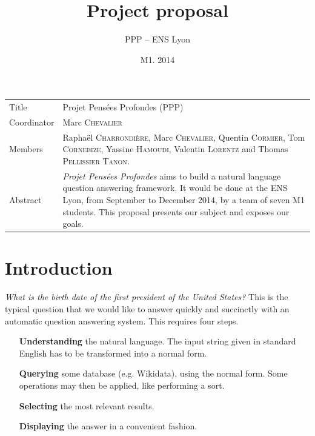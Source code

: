\documentclass[a4paper,10pt]{article}
\title{Project proposal}
\author{PPP \--- ENS Lyon}
\date{M1. 2014}
\begin{document}
\maketitle

\newlength{\title}
\settowidth{\title}{Coordinator }

\newlength{\object}
\setlength{\object}{\textwidth} \addtolength{\object}{-\title} \addtolength{\object}{-6.8pt} 
	\addtolength{\object}{-2\tabcolsep}

\renewcommand{\arraystretch}{1.5}

\begin{center}
\begin{tabular}{@{}|p{\title}p{\object}@{}|}
\hline
Title & Projet Pensées Profondes (PPP)\\
Coordinator & Marc \textsc{Chevalier}\\
Members & Raphaël \textsc{Charrondière}, Marc \textsc{Chevalier}, Quentin 
      \textsc{Cormier}, Tom \textsc{Cornebize}, \linebreak Yassine \textsc{Hamoudi}, 
      Valentin \textsc{Lorentz} and Thomas \textsc{Pellissier} \textsc{Tanon}.\\
Abstract & \emph{Projet Pensées Profondes} aims to build a natural language question answering framework.
It would be done at the ENS Lyon, from September to December 2014, by a team of seven M1 students. This proposal presents
our subject and exposes our goals.\\
\hline
\end{tabular}
\end{center}

\section{Introduction}

\emph{What is the birth date of the first president of the United States?} This is the typical question that we would like to
answer quickly and succinctly with an automatic question answering system. This requires four steps.

\begin{itemize}
\item[\textbf{Understanding}] the natural language. The input string given in standard 
English has to be transformed into a normal form. 

\item[\textbf{Querying}] some database (e.g. Wikidata), using the normal form.
Some operations may then be applied, like performing a sort.

\item[\textbf{Selecting}] the most relevant results.

\item[\textbf{Displaying}] the answer in a convenient fashion.
\end{itemize}
\end{document}
